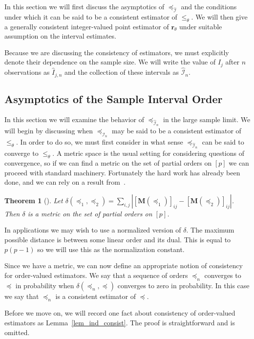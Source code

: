 \documentclass[12pt]{article}
\newcommand{\mat}[1]{\mathbf{M}(#1)}
\newcommand{\iord}{{\preceq_{\hat{\mathcal{I}}}}}
\newcommand{\pord}{{\leqslant_{\theta}}}
\newcommand{\iordn}{{\preceq_{\hat{\mathcal{I}}_{n}}}}
\newcommand{\rankp}{{\mathbf{r}_\theta}}
\newtheorem{theorem}{Theorem}
\numberwithin{theorem}{section}
\begin{document}
In this section we will first discuss the asymptotics of $\iord$ and the conditions under which it can be said to be a consistent estimator of $\pord$.  We will then give a generally consistent integer-valued point estimator of $\rankp$ under suitable assumption on the interval estimates.

Because we are discussing the consistency of estimators, we must explicitly denote their dependence on the sample size.  We will write the value of $\hat{I}_j$ after $n$ observations as $\hat{I}_{j, n}$ and the collection of these intervals as $\hat{\mathcal{I}}_n$.

\subsection{Asymptotics of the Sample Interval Order}
\label{subsec_point_est_asymp}

In this section we will examine the behavior of $\iordn$ in the large sample limit.  We will begin by discussing when $\iordn$ may be said to be a consistent estimator of $\pord$.  In order to do so, we must first consider in what sense $\iordn$ can be said to converge to $\pord$.  A metric space is the usual setting for considering questions of convergence, so if we can find a metric on the set of partial orders on $[p]$ we can proceed with standard machinery.  Fortunately the hard work has already been done, and we can rely on a result from~\cite{bogart1973distance}.

\begin{theorem}[\cite{bogart1973distance}]
\label{thm_ord_dist}
Let $\delta(\preceq_1, \preceq_2) = \sum_{i, j}|[\mat{\preceq_1}]_{ij} - [\mat{\preceq_2}]_{ij}|$.  Then $\delta$ is a metric on the set of partial orders on $[p]$.
\end{theorem}

In applications we may wish to use a normalized version of $\delta$.  The maximum possible distance is between some linear order and its dual.  This is equal to $p(p - 1)$ so we will use this as the normalization constant.

Since we have a metric, we can now define an appropriate notion of consistency for order-valued estimators.  We say that a sequence of orders $\preceq_n$ converges to $\preceq$ in probability when $\delta(\preceq_n, \preceq)$ converges to zero in probability.  In this case we say that $\preceq_n$ is a consistent estimator of $\preceq$.

Before we move on, we will record one fact about consistency of order-valued estimators as Lemma~\ref{lem_ind_consist}.  The proof is straightforward and is omitted.
\end{document}
